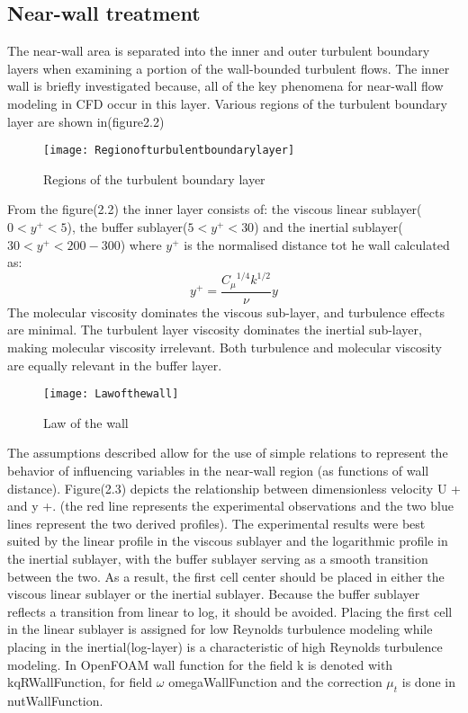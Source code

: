 \subsection{Near-wall treatment}
The near-wall area is  separated into the inner and outer turbulent boundary layers when examining a portion of the wall-bounded turbulent flows. The inner wall is briefly investigated because, 
all of the key phenomena for near-wall flow modeling in CFD occur in this layer. Various regions of the turbulent  boundary layer are shown in(figure2.2)
\begin{figure}[H]
 \centering
 \texttt{[image: Regionofturbulentboundarylayer]}
 \caption{Regions of the turbulent boundary layer}
  \label{fig:fig14}
\end{figure}
From the figure(2.2) the inner layer consists of: the viscous linear sublayer($0<{y^+}<5$), the buffer sublayer($5<{y^+}<30$) and the inertial sublayer($30<{y^+}<200-300$) where ${y^+}$ is the normalised
distance tot he wall calculated as:
\begin{equation}
{y^+}={\frac{{{C_{\mu}}^{1/4}}{k^{1/2}}}{\nu}}y
\end{equation}
The molecular viscosity dominates the viscous sub-layer, and turbulence effects are minimal. The turbulent layer viscosity dominates the inertial sub-layer, making molecular viscosity irrelevant.
Both turbulence and molecular viscosity are equally relevant in the buffer layer. \\
\begin{figure}[H]
 \centering
 \texttt{[image: Lawofthewall]}
 \caption{Law of the wall}
  \label{fig:fig15}
\end{figure}
The assumptions described allow for the use of simple relations to represent the behavior of influencing variables in the near-wall region (as functions of wall distance).
Figure(2.3) depicts the relationship between dimensionless velocity U + and y +. (the red line represents the experimental observations and the two blue lines represent the two derived profiles).
The experimental results were best suited by the linear profile in the viscous sublayer and the logarithmic profile in the inertial sublayer, with the buffer sublayer serving as a smooth transition between the two.
As a result, the first cell center should be placed in either the viscous linear sublayer or the inertial sublayer. Because the buffer sublayer reflects a transition from linear to log, it should be avoided. 
Placing the first cell in the linear sublayer is assigned for low Reynolds turbulence modeling while placing in the inertial(log-layer) is a characteristic of high Reynolds turbulence modeling. In OpenFOAM
wall function for the field k is denoted with kqRWallFunction, for field $\omega$ omegaWallFunction and the correction ${\mu}_t$ is done in nutWallFunction.
